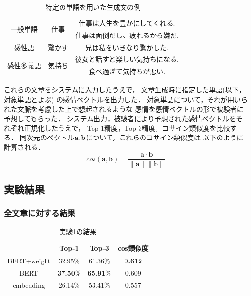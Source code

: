 		\begin{table}[H]
			\centering
			\caption{特定の単語を用いた生成文の例}
			\label{table:generated_sentences_sample}
			\begin{tabular}{|c|c|c|}
				\hline
				\multirow{2}{*}{一般単語} & \multirow{2}{*}{仕事} & 仕事は人生を豊かにしてくれる. \\
				\cline{3-3}
				& & 仕事は面倒だし、疲れるから嫌だ. \\
				\hline
				感性語 & 驚かす & 兄は私をいきなり驚かした. \\
				\hline
				\multirow{2}{*}{感性多義語} & \multirow{2}{*}{気持ち} & 彼女と話すと楽しい気持ちになる. \\
				\cline{3-3}
				& & 食べ過ぎて気持ちが悪い. \\
				\hline
			\end{tabular}
		\end{table}

		これらの文章をシステムに入力したうえで，
		文章生成時に指定した単語(以下，対象単語とよぶ)
		の感情ベクトルを出力した．
		対象単語について，それが用いられた文脈を考慮した上で想起されるような
		感情を感情ベクトルの形で被験者に予想してもらった．
		システム出力，被験者により予想された感情ベクトルをそれぞれ正規化したうえで，
		Top-1精度，Top-3精度，コサイン類似度を比較する．
		同次元のベクトル$\bold{a},\bold{b}$について，これらのコサイン類似度は
		以下のように計算される．
		\begin{equation}
			cos(\boldsymbol{a},\boldsymbol{b})=\frac{\boldsymbol{a}\cdot\boldsymbol{b}}{\|\boldsymbol{a}\|\|\boldsymbol{b}\|}
		\end{equation}

	\subsection{実験結果}
		\subsubsection{全文章に対する結果}
			\begin{table}[H]
				\centering
				\caption{実験1の結果}
				\label{table:top-k_cos-sim_all}
					\begin{tabular}{cccc}
						\hline
						& Top-1 & Top-3 & cos類似度 \\
						\hline \hline
						BERT+weight & 32.95\% & 61.36\% & \textbf{0.612} \\
						BERT & \textbf{37.50}\% & \textbf{65.91}\% & 0.609 \\
						embedding & 26.14\% & 53.41\% & 0.557\\
						\hline
					\end{tabular}
			\end{table}

